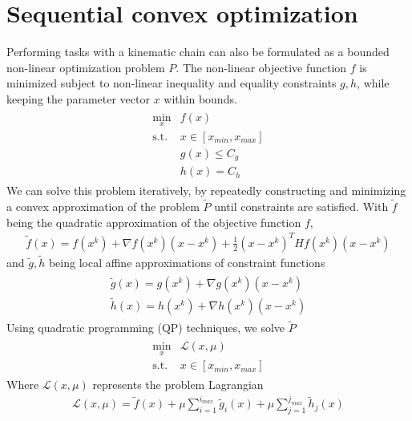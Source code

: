 \documentclass[times, utf8, diplomski, english]{fer}
\begin{document}
\section{Sequential convex optimization}\label{section:sqp}
Performing tasks with a kinematic chain can also be formulated as a bounded non-linear optimization problem $P$. 
The non-linear objective function $f$ is minimized subject to non-linear inequality and equality constraints $g , h$, while keeping the parameter vector $x$ within bounds. 
\begin{align}
\label{optik_1}
\begin{array}{rl}
\min\limits_{x} & f(x) \\
\mbox{s.t.} & x \in \left[x_{min}, x_{max}\right] \\
  & g(x) \le C_{g} \\
  & h(x) = C_{h}
\end{array}
\end{align}
We can solve this problem iteratively, by repeatedly constructing and minimizing a convex approximation of the problem $\tilde{P}$ until constraints are satisfied. With $\tilde{f}$ being the quadratic approximation of the objective function $f$,
\begin{align}
\label{optik_2}
\tilde{f}\left(x\right) = f\left(x^k\right) + \nabla f\left(x^k\right)\left(x - x^k\right) + \frac{1}{2}\left(x - x^k\right)^T Hf\left(x^k\right)\left(x - x^k\right)
\end{align}
 and $\tilde{g}, \tilde{h}$ being local affine approximations of constraint functions
 \begin{eqnarray}
 \begin{split}
 \label{optik_3}
\tilde{g}\left(x\right) = g\left(x^k\right) + \nabla g\left(x^k\right)\left(x - x^k\right) \\
\tilde{h}\left(x\right) = h\left(x^k\right) + \nabla h\left(x^k\right)\left(x - x^k\right) 
\end{split}
\end{eqnarray}
Using quadratic programming (QP) techniques, we solve $\tilde{P}$
\begin{align}
\label{optik_4}
 \begin{array}{rl}
\min\limits_{x} & \mathcal{L}\left(x,\mu\right)\\
\mbox{s.t.} & x \in \left[x_{min}, x_{max}\right]
\end{array}
\end{align}
Where $\mathcal{L}\left(x,\mu\right)$ represents the problem Lagrangian
\begin{align}
\label{optik_5}
\mathcal{L}(x,\mu) = \tilde{f}\left(x\right) + \mu\sum\limits_{i = 1}^{i_{max}}{\tilde{g}_{i}\left(x\right)}
+ \mu\sum\limits_{j = 1}^{j_{max}}{\tilde{h}_{j}\left(x\right)}
\end{align}
\end{document}
